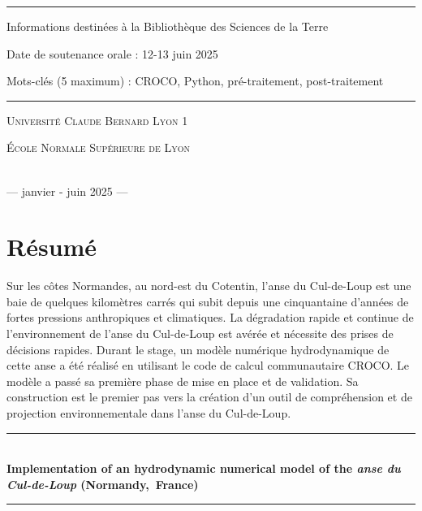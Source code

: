 \documentclass[10pt,a4paper,titlepage]{article}
\newcommand{\HRule}{\rule{\linewidth}{0.5mm}}
\begin{document}
\begin{titlepage}
\begin{sffamily}
\begin{center}
\HRule \vspace{0.2cm}
Informations destinées à la Bibliothèque des Sciences de la Terre

Date de soutenance orale : 12-13 juin 2025

Mots-clés (5 maximum) : CROCO, Python, pré-traitement, post-traitement
\HRule \vspace{0.2cm}
                \begin{minipage}{0.45\textwidth}
                    \begin{flushleft}
                        \textsc{Université Claude Bernard Lyon 1}
                    \end{flushleft}
                \end{minipage}
                \begin{minipage}{0.45\textwidth}
                    \begin{flushright}
                        \textsc{École Normale Supérieure de Lyon}
                    \end{flushright}
                \end{minipage}
                \\
                \vspace{1cm}
                {\large— janvier - juin 2025 —}

            \end{center}
        \end{sffamily}
    \end{titlepage}
\newpage

\section*{Résumé}
Sur les côtes Normandes, au nord-est du Cotentin, l'anse du Cul-de-Loup est une baie de quelques kilomètres carrés qui subit depuis une cinquantaine d'années de fortes pressions anthropiques et climatiques.
La dégradation rapide et continue de l'environnement de l'anse du Cul-de-Loup est avérée et nécessite des prises de décisions rapides.
Durant le stage, un modèle numérique hydrodynamique de cette anse a été réalisé en utilisant le code de calcul communautaire CROCO.
Le modèle a passé sa première phase de mise en place et de validation.
Sa construction est le premier pas vers la création d'un outil de compréhension et de projection environnementale dans l'anse du Cul-de-Loup.


\vfill
\begin{sffamily}
\begin{center}
\HRule \\[0.4cm]
{ \huge \bfseries Implementation of an hydrodynamic numerical model of the \textit{anse du Cul-de-Loup} (Normandy,~France)\\ [0.4cm] }

\HRule \\[2cm]
\end{center}
\end{sffamily}
\vspace{0.5cm}
\end{document}
